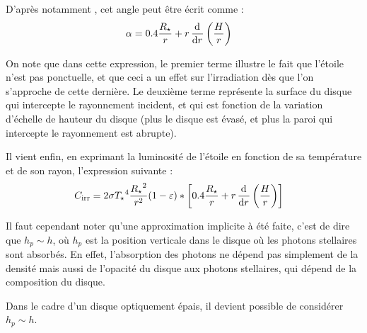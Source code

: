 D'après notamment \cite[eq. (5)]{chiang1997spectral}, cet angle peut être écrit comme : 
\begin{align}
\alpha &= 0.4 \frac{R_\star}{r} + r \mathinner{ \dfrac{\operatorname{d \!}{^{}}}{\operatorname{d \!}{{r}^{}}} }\left(\frac{H}{r}\right)
\end{align}

On note que dans cette expression, le premier terme illustre le fait que l'étoile n'est pas ponctuelle, et que ceci a un effet sur l'irradiation dès que l'on s'approche de cette dernière. Le deuxième terme représente la surface du disque qui intercepte le rayonnement incident, et qui est fonction de la variation d'échelle de hauteur du disque (plus le disque est évasé, et plus la paroi qui intercepte le rayonnement est abrupte). 

Il vient enfin, en exprimant la luminosité de l'étoile en fonction de sa température et de son rayon, l'expression suivante :
\begin{align}
C_\text{irr} &= 2 \sigma {T_\star}^4 \frac{{R_\star}^2}{r^2} (1-\varepsilon) * \left[0.4 \frac{R_\star}{r} + r \mathinner{ \dfrac{\operatorname{d \!}{^{}}}{\operatorname{d \!}{{r}^{}}} }\left(\frac{H}{r}\right)\right]
\end{align}

Il faut cependant noter qu'une approximation implicite à été faite, c'est de dire que $h_p\sim h$, où $h_p$ est la position verticale dans le disque où les photons stellaires sont absorbés. En effet, l'absorption des photons ne dépend pas simplement de la densité mais aussi de l'opacité du disque aux photons stellaires, qui dépend de la composition du disque.

Dans le cadre d'un disque optiquement épais, il devient possible de considérer $h_p \sim h$.


